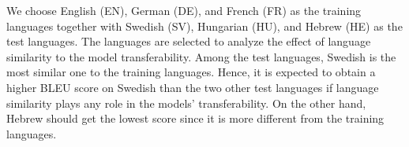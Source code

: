 \documentclass[11pt,a4paper]{article}
\begin{document}
We choose English (EN), German (DE), and French (FR) as the training languages together with Swedish (SV), Hungarian (HU), and Hebrew (HE) as the test languages. The languages are selected to analyze the effect of language similarity to the model transferability. Among the test languages, Swedish is the most similar one to the training languages. Hence, it is expected to obtain a higher BLEU score on Swedish than the two other test languages if language similarity plays any role in the models' transferability. On the other hand, Hebrew should get the lowest score since it is more different from the training languages. %


\end{document}
